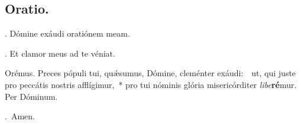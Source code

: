 \subsection*{Oratio.}

\begin{versicles}
\Vbar. Dómine exáudi oratiónem meam.

\Rbar. Et clamor meus ad te véniat.
\end{versicles}

Orémus.
Preces pópuli tui, qu\'{\ae}sumus, Dómine, cleménter exáudi:~\GreDagger\
ut, qui juste pro peccátis nostris afflígimur,~*
pro tui nóminis glória misericórditer \textit{libe}\textbf{ré}mur.
Per Dóminum.

\Rbar.~Amen.